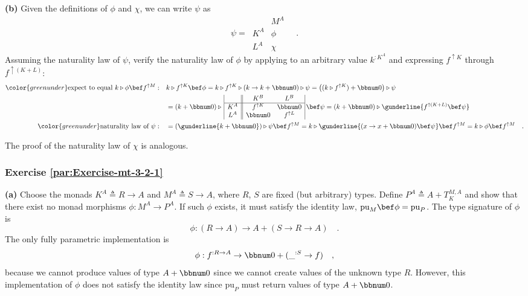 \textbf{(b)} Given the definitions of $\phi$ and $\chi$, we can
write $\psi$ as
\[
\psi=\,\begin{array}{|c||c|}
 & M^{A}\\
\hline K^{A} & \phi\\
L^{A} & \chi
\end{array}\quad.
\]
Assuming the naturality law of $\psi$, verify the naturality law
of $\phi$ by applying to an arbitrary value $k^{:K^{A}}$ and expressing
$f^{\uparrow K}$ through $f^{\uparrow(K+L)}$: 
\begin{align*}
{\color{greenunder}\text{expect to equal }k\triangleright\phi\bef f^{\uparrow M}:}\quad & k\triangleright f^{\uparrow K}\bef\phi=k\triangleright f^{\uparrow K}\triangleright(k\rightarrow k+\bbnum 0)\triangleright\psi=\big((k\triangleright f^{\uparrow K})+\bbnum 0\big)\triangleright\psi\\
 & =(k+\bbnum 0)\triangleright\,\begin{array}{|c||cc|}
 & K^{B} & L^{B}\\
\hline K^{A} & f^{\uparrow K} & \bbnum 0\\
L^{A} & \bbnum 0 & f^{\uparrow L}
\end{array}\,\bef\psi=(k+\bbnum 0)\triangleright\gunderline{f^{\uparrow(K+L)}\bef\psi}\\
{\color{greenunder}\text{naturality law of }\psi:}\quad & =(\gunderline{k+\bbnum 0})\triangleright\psi\bef f^{\uparrow M}=k\triangleright\gunderline{(x\rightarrow x+\bbnum 0)\bef\psi}\bef f^{\uparrow M}=k\triangleright\phi\bef f^{\uparrow M}\quad.
\end{align*}

The proof of the naturality law of $\chi$ is analogous.

\subsubsection*{Exercise \ref{par:Exercise-mt-3-2-1}}

\textbf{(a)} Choose the monads $K^{A}\triangleq R\rightarrow A$ and
$M^{A}\triangleq S\rightarrow A$, where $R$, $S$ are fixed (but
arbitrary) types. Define $P^{A}\triangleq A+T_{K}^{M,A}$ and show
that there exist no monad morphisms $\phi:M^{A}\rightarrow P^{A}$.
If such $\phi$ exists, it must satisfy the identity law, $\text{pu}_{M}\bef\phi=\text{pu}_{P}$.
The type signature of $\phi$ is
\[
\phi:(R\rightarrow A)\rightarrow A+(S\rightarrow R\rightarrow A)\quad.
\]
The only fully parametric implementation is
\[
\phi:f^{:R\rightarrow A}\rightarrow\bbnum 0+(\_^{:S}\rightarrow f)\quad,
\]
because we cannot produce values of type $A+\bbnum 0$ since we cannot
create values of the unknown type $R$. However, this implementation
of $\phi$ does not satisfy the identity law since $\text{pu}_{P}$
must return values of type $A+\bbnum 0$.

